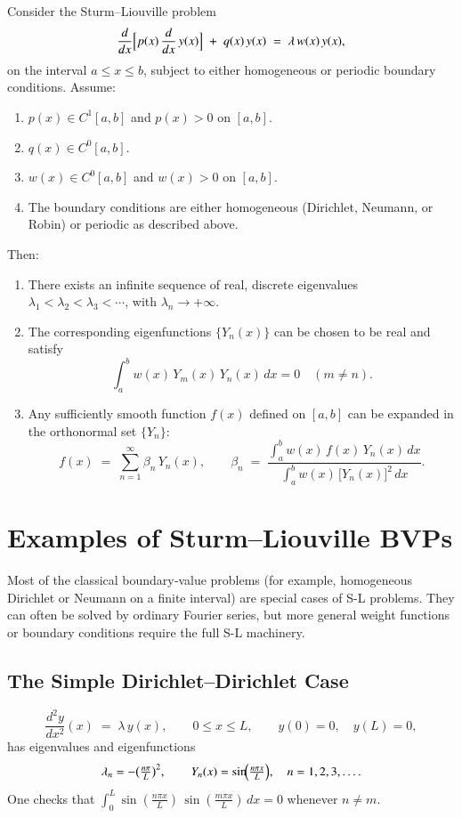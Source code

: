 \documentclass{report}
\begin{document}
Consider the Sturm–Liouville problem
\[
\frac{d}{dx}\Bigl[p(x)\,\frac{d}{dx}\,y(x)\Bigr] \;+\; q(x)\,y(x) \;=\; \lambda\,w(x)\,y(x),
\]
on the interval \(a \le x \le b\), subject to either homogeneous or periodic boundary conditions.  Assume:
\begin{enumerate}
  \item \(p(x)\in C^{1}[a,b]\) and \(p(x)>0\) on \([a,b]\).
  \item \(q(x)\in C^{0}[a,b]\).
  \item \(w(x)\in C^{0}[a,b]\) and \(w(x)>0\) on \([a,b]\).
  \item The boundary conditions are either homogeneous (Dirichlet, Neumann, or Robin) or periodic as described above.
\end{enumerate}
Then:
\begin{enumerate}
  \item There exists an infinite sequence of real, discrete eigenvalues 
    \(\lambda_{1} < \lambda_{2} < \lambda_{3} < \cdots\), with \(\lambda_{n} \to +\infty\).
  \item The corresponding eigenfunctions \(\{Y_{n}(x)\}\) can be chosen to be real and satisfy
    \[
    \int_{a}^{b} w(x)\,Y_{m}(x)\,Y_{n}(x)\,dx = 0 \quad (m\neq n).
    \]
  \item Any sufficiently smooth function \(f(x)\) defined on \([a,b]\) can be expanded in the orthonormal set \(\{Y_{n}\}\):
    \[
    f(x) \;=\; \sum_{n=1}^{\infty} \beta_{n}\,Y_{n}(x), 
    \qquad
    \beta_{n} 
    \;=\;
    \frac{\displaystyle\int_{a}^{b} w(x)\,f(x)\,Y_{n}(x)\,dx}{\displaystyle\int_{a}^{b} w(x)\,\bigl[Y_{n}(x)\bigr]^{2}\,dx}.
    \]
\end{enumerate}

\section{Examples of Sturm–Liouville BVPs}

Most of the classical boundary‐value problems (for example, homogeneous Dirichlet or Neumann on a finite interval) are special cases of S-L problems.  They can often be solved by ordinary Fourier series, but more general weight functions or boundary conditions require the full S-L machinery.

\subsection{The Simple Dirichlet–Dirichlet Case}

\[
\frac{d^{2}y}{dx^{2}}(x) \;=\; \lambda\,y(x),
\qquad
0 \le x \le L,
\qquad
y(0)=0,\quad y(L)=0,
\]
has eigenvalues and eigenfunctions
\[
\lambda_{n} = -\bigl(\tfrac{n\pi}{L}\bigr)^{2},
\qquad
Y_{n}(x) = \sin\!\Bigl(\tfrac{n\pi x}{L}\Bigr), 
\quad n = 1,2,3,\dots.
\]
One checks that 
\(\int_{0}^{L}\sin(\tfrac{n\pi x}{L})\,\sin(\tfrac{m\pi x}{L})\,dx=0\) whenever \(n\neq m\).
\end{document}
